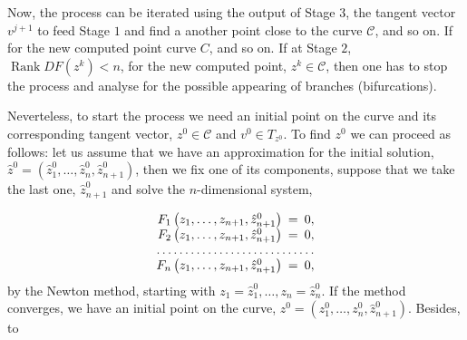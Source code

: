 \documentclass[11pt,reqno,twoside]{article}
\theoremstyle{remark}
\begin{document}
Now, the process can be iterated using the output of Stage $3$, the tangent
vector $v^{j+1}$ to feed Stage $1$ and find a another point close to the
curve  $\mathcal{C}$, and so on. If for the new computed point curve $C$,
and so on. If at Stage $2$, $\mathop{Rank} DF\left(z^{k}\right) < n$, for
the new computed point, $z^{k}\in\mathcal{C}$, then
 one has to stop the process and analyse for the possible
appearing of branches (bifurcations).

Neverteless, to start the process we need an initial point on the curve and
its corresponding tangent vector, $z^{0}\in\mathcal{C}$ and $v^{0}\in
T_{z^{0}}$. To find $z^{0}$ we can proceed as follows: let us assume that
we have an approximation for the initial solution, $\hat{z}^{0} =
\left(\hat{z}^{0}_{1},\dots,\hat{z}^{0}_{n}, \hat{z}^{0}_{n+1}\right)$,
then we fix one of its components, suppose that we take the last one,
$\hat{z}^{0}_{n+1}$ and solve the $n$-dimensional system,

\begin{displaymath}
  \begin{array}{rcl}
    F_{1}\left(z_{1},\dots, z_{n+1},
    \hat{z}^{0}_{n+1}\right)&\!\!\!=&\!\!\! 0,\\
    F_{2}\left(z_{1},\dots, z_{n+1},
  \hat{z}^{0}_{n+1}\right)&\!\!\!=&\!\!\! 0,\\ 
  \hdotsfor{3}\\ 
    F_{n}\left(z_{1},\dots, z_{n+1},
  \hat{z}^{0}_{n+1}\right)&\!\!\!=&\!\!\! 0, 
\end{array}
\end{displaymath}
by the Newton method, starting with $z_{1} = \hat{z}^{0}_{1},\dots,z_{n} =
\hat{z}^{0}_{n}$. If the method converges, we have an initial point on the
curve, $z^{0} = \left(z^{0}_{1},\dots,z^{0}_{n},\hat{z}^{0}_{n+1}\right)$.
Besides, to 



\end{document}
